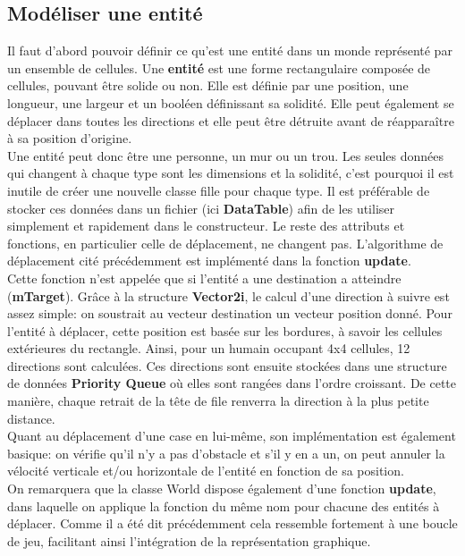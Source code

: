 \documentclass[11pt]{article} %
\begin{document}
\subsection{Modéliser une entité}
Il faut d'abord pouvoir définir ce qu'est une entité dans un monde représenté par un ensemble de cellules. 
Une \textbf{entité} est une forme rectangulaire composée de cellules, pouvant être solide ou non. Elle est définie par une position, une longueur, une largeur et un booléen définissant sa solidité. Elle peut également se déplacer dans toutes les directions et elle peut être détruite avant de réapparaître à sa position d'origine. \\
Une entité peut donc être une personne, un mur ou un trou. Les seules données qui changent à chaque type sont les dimensions et la solidité, c'est pourquoi il est inutile de créer une nouvelle classe fille pour chaque type. Il est préférable de stocker ces données dans un fichier (ici \textbf{DataTable}) afin de les utiliser simplement et rapidement dans le constructeur. Le reste des attributs et fonctions, en particulier celle de déplacement, ne changent pas.
 L'algorithme de déplacement cité précédemment est implémenté dans la fonction \textbf{update}. \\
Cette fonction n'est appelée que si l'entité a une destination a atteindre (\textbf{mTarget}). Grâce à la structure \textbf{Vector2i}, le calcul d'une direction à suivre est assez simple: on soustrait au vecteur destination un vecteur position donné. Pour l'entité à déplacer, cette position est basée sur les bordures, à savoir les cellules extérieures du rectangle. Ainsi, pour un humain occupant 4x4 cellules, 12 directions sont calculées. Ces directions sont ensuite stockées dans une structure de données \textbf{Priority Queue} où elles sont rangées dans l'ordre croissant. De cette manière, chaque retrait de la tête de file renverra la direction à la plus petite distance. \\

Quant au déplacement d'une case en lui-même, son implémentation est également basique: on vérifie qu'il n'y a pas d'obstacle et s'il y en a un, on peut annuler la vélocité verticale et/ou horizontale de l'entité en fonction de sa position. \\
On remarquera que la classe World dispose également d'une fonction \textbf{update}, dans laquelle on applique la fonction du même nom pour chacune des entités à déplacer. Comme il a été dit précédemment cela ressemble fortement à une boucle de jeu, facilitant ainsi l'intégration de la représentation graphique.
\end{document}
